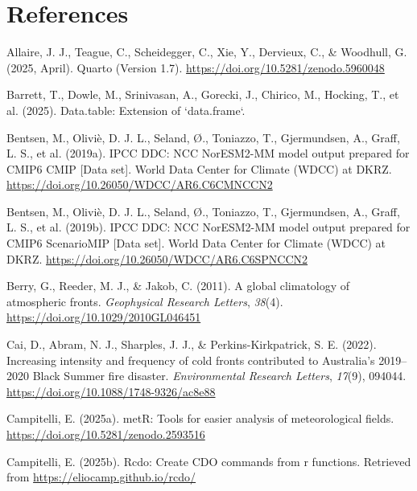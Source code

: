 \documentclass[
]{agujournal2019}
\newlength{\cslhangindent}
\newenvironment{CSLReferences}[2] %
 {\begin{list}{}{%
  \setlength{\itemindent}{0pt}
  \setlength{\leftmargin}{0pt}
  \setlength{\parsep}{0pt}
  \ifodd #1
   \setlength{\leftmargin}{\cslhangindent}
   \setlength{\itemindent}{-1\cslhangindent}
  \fi
  \setlength{\itemsep}{#2\baselineskip}}}
 {\end{list}}
\begin{document}
\section*{References}\label{references}

\label{refs}
\begin{CSLReferences}{1}{0}
\vspace{1em}

Allaire, J. J., Teague, C., Scheidegger, C., Xie, Y., Dervieux, C., \&
Woodhull, G. (2025, April). {Quarto} (Version 1.7).
\url{https://doi.org/10.5281/zenodo.5960048}

Barrett, T., Dowle, M., Srinivasan, A., Gorecki, J., Chirico, M.,
Hocking, T., et al. (2025). Data.table: Extension of `data.frame`.

Bentsen, M., Oliviè, D. J. L., Seland, Ø., Toniazzo, T., Gjermundsen,
A., Graff, L. S., et al. (2019a). {IPCC DDC}: {NCC NorESM2-MM} model
output prepared for {CMIP6 CMIP} {[}Data set{]}. World Data Center for
Climate (WDCC) at DKRZ.
\url{https://doi.org/10.26050/WDCC/AR6.C6CMNCCN2}

Bentsen, M., Oliviè, D. J. L., Seland, Ø., Toniazzo, T., Gjermundsen,
A., Graff, L. S., et al. (2019b). {IPCC DDC}: {NCC NorESM2-MM} model
output prepared for {CMIP6 ScenarioMIP} {[}Data set{]}. World Data
Center for Climate (WDCC) at DKRZ.
\url{https://doi.org/10.26050/WDCC/AR6.C6SPNCCN2}

Berry, G., Reeder, M. J., \& Jakob, C. (2011). A global climatology of
atmospheric fronts. \emph{Geophysical Research Letters}, \emph{38}(4).
\url{https://doi.org/10.1029/2010GL046451}

Cai, D., Abram, N. J., Sharples, J. J., \& Perkins-Kirkpatrick, S. E.
(2022). Increasing intensity and frequency of cold fronts contributed to
{Australia}'s 2019--2020 {Black Summer} fire disaster.
\emph{Environmental Research Letters}, \emph{17}(9), 094044.
\url{https://doi.org/10.1088/1748-9326/ac8e88}

Campitelli, E. (2025a). metR: Tools for easier analysis of
meteorological fields. \url{https://doi.org/10.5281/zenodo.2593516}

Campitelli, E. (2025b). Rcdo: Create CDO commands from r functions.
Retrieved from \url{https://eliocamp.github.io/rcdo/}


\end{CSLReferences}
\end{document}
